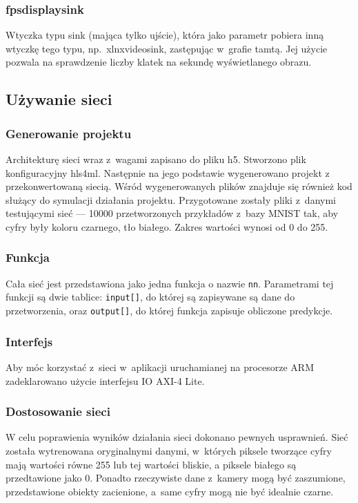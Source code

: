 \documentclass[12pt, oneside, a4paper]{article}
\begin{document}
\subsubsection{fpsdisplaysink}\label{sec:fpsdisplaysink}
Wtyczka typu sink (mająca tylko ujście), która jako parametr
pobiera inną wtyczkę tego typu, np.~xlnxvideosink,
zastępując w~grafie tamtą.
Jej użycie pozwala na sprawdzenie liczby klatek na sekundę
wyświetlanego obrazu.


\subsection{Używanie sieci}\label{sec:Uzywanie sieci}
\subsubsection{Generowanie projektu}\label{sec:Generowanie projektu}
Architekturę sieci wraz z~wagami zapisano do pliku h5. Stworzono
plik konfiguracyjny hls4ml. Następnie na jego podstawie wygenerowano projekt
z przekonwertowaną siecią. Wśród wygenerowanych plików znajduje się
również kod służący do symulacji działania projektu. Przygotowane zostały
pliki z~danymi testującymi sieć --- 10000 przetworzonych przykładów z~bazy
MNIST tak, aby cyfry były koloru czarnego, tło białego. Zakres wartości
wynosi od 0 do 255.

\subsubsection{Funkcja}\label{section:funkcja}
Cała sieć jest przedstawiona jako jedna funkcja o nazwie \lstinline{nn}.
Parametrami tej funkcji są dwie tablice:
\lstinline[style=hls]{input[]}, do której są zapisywane są
dane do przetworzenia,
oraz \lstinline[style=hls]{output[]}, do której funkcja zapisuje
obliczone predykcje.

\begin{minipage}{\linewidth}

\end{minipage}

\subsubsection{Interfejs}\label{sec:Interfejs}
Aby móc korzystać z~sieci w~aplikacji uruchamianej na procesorze ARM
zadeklarowano użycie interfejsu IO \mbox{AXI-4} Lite.

\subsubsection{Dostosowanie sieci}\label{sec:Dostosowanie sieci}
W celu poprawienia wyników działania sieci dokonano pewnych usprawnień.
Sieć została wytrenowana oryginalnymi danymi, w~których piksele tworzące
cyfry mają wartości równe 255 lub tej wartości bliskie,
a piksele białego są przedtawione jako 0.
Ponadto rzeczywiste dane z~kamery mogą być zaszumione,
przedstawione obiekty zacienione, a~same cyfry mogą nie być idealnie czarne.
\end{document}
